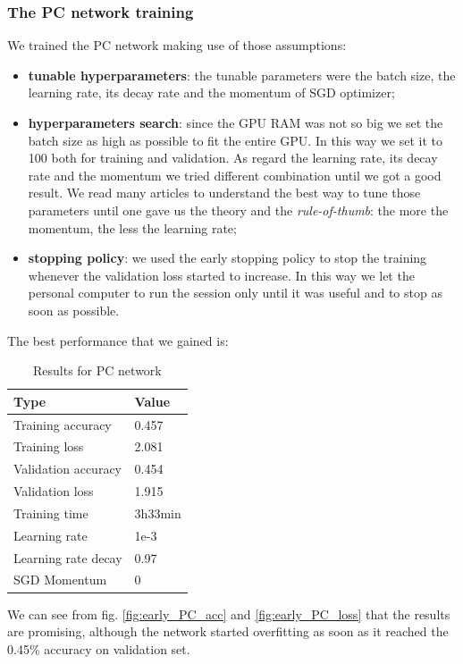 \subsubsection{The PC network training}\label{sss:PC_training}
We trained the PC network making use of those assumptions:
\begin{itemize}
    \item \textbf{tunable hyperparameters}: the tunable parameters were the batch size, the learning rate, its decay rate and the momentum of SGD optimizer;
    \item \textbf{hyperparameters search}: since the GPU RAM was not so big we set the batch size as high as possible to fit the entire GPU. In this way we set it to 100 both for training and validation. As regard the learning rate, its decay rate and the momentum we tried different combination until we got a good result. We read many articles to understand the best way to tune those parameters until one \cite{SGD_momentum} gave us the theory and the \textit{rule-of-thumb}: the more the momentum, the less the learning rate;
    \item \textbf{stopping policy}: we used the early stopping policy to stop the training whenever the validation loss started to increase. In this way we let the personal computer to run the session only until it was useful and to stop as soon as possible.
\end{itemize}

The best performance that we gained is:
\begin{table}[!ht]
    \begin{center}
        \label{tab:PC_early_results}
        \begin{tabular}{l|l}
            \rowcolor{gray!50}
            \textbf{Type} & \textbf{Value} \\
            \hline
            Training accuracy & 0.457\\
            Training loss & 2.081\\
            Validation accuracy & 0.454\\
            Validation loss & 1.915\\
            Training time & 3h33min\\
            Learning rate & 1e-3\\
            Learning rate decay & 0.97\\
            SGD Momentum & 0\\
            \hline
        \end{tabular}
    \end{center}
    \caption{Results for PC network}
\end{table}
We can see from fig. \ref{fig:early_PC_acc} and \ref{fig:early_PC_loss} that the results are promising, although the network started overfitting as soon as it reached the 0.45\% accuracy on validation set.

